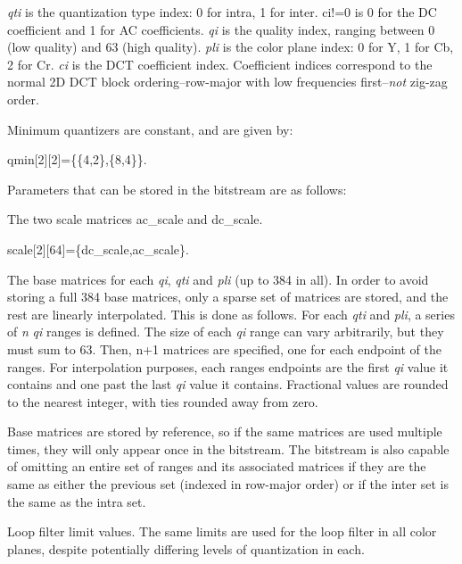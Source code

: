 {\itshape qti} is the quantization type index\+: 0 for intra, 1 for inter. {\ttfamily ci!=0} is 0 for the DC coefficient and 1 for AC coefficients. {\itshape qi} is the quality index, ranging between 0 (low quality) and 63 (high quality). {\itshape pli} is the color plane index\+: 0 for Y\textquotesingle{}, 1 for Cb, 2 for Cr. {\itshape ci} is the D\+CT coefficient index. Coefficient indices correspond to the normal 2D D\+CT block ordering--row-\/major with low frequencies first--{\itshape not} zig-\/zag order.

Minimum quantizers are constant, and are given by\+: 
\begin{DoxyCode}
qmin[2][2]=\{\{4,2\},\{8,4\}\}.
\end{DoxyCode}


Parameters that can be stored in the bitstream are as follows\+:
\begin{DoxyItemize}
\item The two scale matrices ac\+\_\+scale and dc\+\_\+scale. 
\begin{DoxyCode}
scale[2][64]=\{dc_scale,ac_scale\}.
\end{DoxyCode}

\item The base matrices for each {\itshape qi}, {\itshape qti} and {\itshape pli} (up to 384 in all). In order to avoid storing a full 384 base matrices, only a sparse set of matrices are stored, and the rest are linearly interpolated. This is done as follows. For each {\itshape qti} and {\itshape pli}, a series of {\itshape n} {\itshape qi} ranges is defined. The size of each {\itshape qi} range can vary arbitrarily, but they must sum to 63. Then, {\ttfamily n+1} matrices are specified, one for each endpoint of the ranges. For interpolation purposes, each range\textquotesingle{}s endpoints are the first {\itshape qi} value it contains and one past the last {\itshape qi} value it contains. Fractional values are rounded to the nearest integer, with ties rounded away from zero.

Base matrices are stored by reference, so if the same matrices are used multiple times, they will only appear once in the bitstream. The bitstream is also capable of omitting an entire set of ranges and its associated matrices if they are the same as either the previous set (indexed in row-\/major order) or if the inter set is the same as the intra set.
\item Loop filter limit values. The same limits are used for the loop filter in all color planes, despite potentially differing levels of quantization in each.
\end{DoxyItemize}

